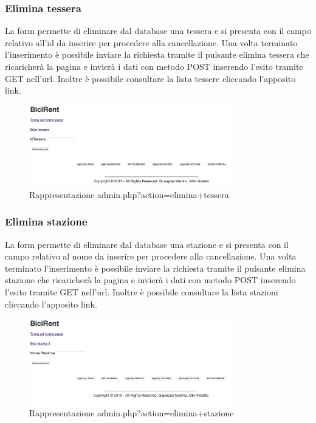 \documentclass[a4paper,twoside]{article}
\begin{document}
\subsubsection{Elimina tessera}
La form permette di eliminare dal database una tessera e si presenta con il campo relativo all'id da inserire per procedere alla cancellazione. Una volta terminato l'inserimento è possibile inviare la richiesta tramite il pulsante elimina tessera che ricaricherà la pagina e invierà i dati con metodo POST inserendo l'esito tramite GET nell'url. Inoltre è possibile consultare la lista tessere cliccando l'apposito link.
\begin{figure}[H]
	\centering
	\includegraphics[width=0.8\textwidth]{Screenshot09}
	\caption{Rappresentazione admin.php?action=elimina+tessera}
\end{figure}
\subsubsection{Elimina stazione}
La form permette di eliminare dal database una stazione e si presenta con il campo relativo al nome da inserire per procedere alla cancellazione. Una volta terminato l'inserimento è possibile inviare la richiesta tramite il pulsante elimina stazione che ricaricherà la pagina e invierà i dati con metodo POST inserendo l'esito tramite GET nell'url. Inoltre è possibile consultare la lista stazioni cliccando l'apposito link.
\begin{figure}[H]
	\centering
	\includegraphics[width=0.8\textwidth]{Screenshot10}
	\caption{Rappresentazione admin.php?action=elimina+stazione}
\end{figure}
\end{document}
